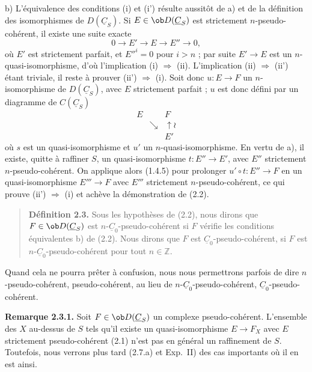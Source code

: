 b) L'équivalence des conditions (i) et (i') résulte aussitôt de a) et de la définition des isomorphismes de $D(\underline{C}_S)$. Si $E \in \ob D(\underline{C}_S)$ est strictement $n$-pseudo-cohérent, il existe une suite exacte
\[
0 \longrightarrow E' \longrightarrow E \longrightarrow E'' \longrightarrow 0,
\]
où $E'$ est strictement parfait, et $E''^i = 0$ pour $i > n$ ; par suite $E' \to E$ est un $n$-quasi-isomorphisme, d'où l'implication (i) $\Rightarrow$ (ii). L'implication (ii) $\Rightarrow$ (ii') étant triviale, il reste à prouver (ii') $\Rightarrow$ (i). Soit donc $u : E \to F$ un $n$-isomorphisme de $D(\underline{C}_S)$, avec $E$ strictement parfait ; $u$ est donc défini par un diagramme de $C(\underline{C}_S)$
\[
\begin{array}{ccc}
E & & F \\
& \searrow & \uparrow \wr \\
& & E'
\end{array}
\]
où $s$ est un quasi-isomorphisme et $u'$ un $n$-quasi-isomorphisme. En vertu de a), il existe, quitte à raffiner $S$, un quasi-isomorphisme $t : E'' \to E'$, avec $E''$ strictement $n$-pseudo-cohérent. On applique alors (1.4.5) pour prolonger $u' \circ t : E'' \to F$ en un quasi-isomorphisme $E''' \to F$ avec $E'''$ strictement $n$-pseudo-cohérent, ce qui prouve (ii') $\Rightarrow$ (i) et achève la démonstration de (2.2).

\begin{quote}
\textbf{Définition 2.3.} Sous les hypothèses de (2.2), nous dirons que $F \in \ob D(\underline{C}_S)$ est $n$-$\underline{C}_0$-pseudo-cohérent si $F$ vérifie les conditions équivalentes b) de (2.2). Nous dirons que $F$ est $\underline{C}_0$-pseudo-cohérent, si $F$ est $n$-$\underline{C}_0$-pseudo-cohérent pour tout $n \in \mathbb{Z}$.
\end{quote}

Quand cela ne pourra prêter à confusion, nous nous permettrons parfois de dire $n$-pseudo-cohérent, pseudo-cohérent, au lieu de $n$-$\underline{C}_0$-pseudo-cohérent, $\underline{C}_0$-pseudo-cohérent.

\textbf{Remarque 2.3.1.} Soit $F \in \ob D(\underline{C}_S)$ un complexe pseudo-cohérent. L'ensemble des $X$ au-dessus de $S$ tels qu'il existe un quasi-isomorphisme $E \to F_X$ avec $E$ strictement pseudo-cohérent (2.1) n'est pas en général un raffinement de $S$. Toutefois, nous verrons plus tard (2.7.a) et Exp.\ II) des cas importants où il en est ainsi.

